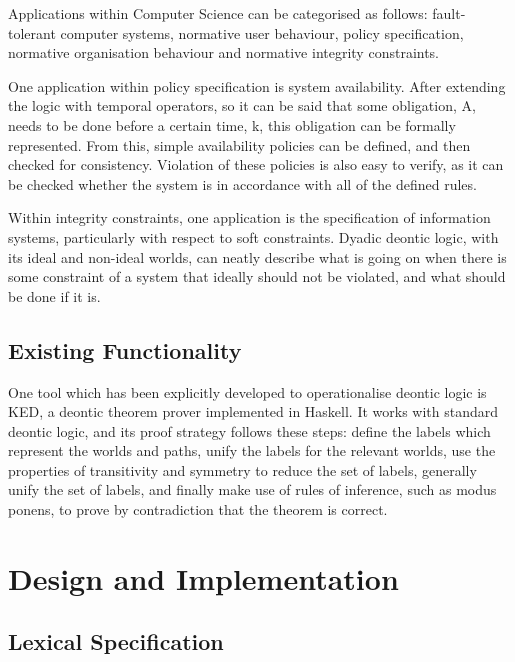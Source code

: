 \documentclass{l4proj}
\begin{document}
Applications within Computer Science can be categorised as follows\cite{meyer93applications}: fault-tolerant computer systems, normative user behaviour, policy specification, normative organisation behaviour and normative integrity constraints. %

One application within policy specification is system availability\cite{brunel04deontic}. After extending the logic with temporal operators, so it can be said that some obligation, A, needs to be done before a certain time, k, this obligation can be formally represented. From this, simple availability policies can be defined, and then checked for consistency. Violation of these policies is also easy to verify, as it can be checked whether the system is in accordance with all of the defined rules. 

Within integrity constraints, one application is the specification of information systems\cite{infosystems}, particularly with respect to soft constraints. Dyadic deontic logic, with its ideal and non-ideal worlds, can neatly describe what is going on when there is some constraint of a system that ideally should not be violated, and what should be done if it is. 

\section{Existing Functionality}
One tool which has been explicitly developed to operationalise deontic logic is KED\cite{KED}, a deontic theorem prover implemented in Haskell. It works with standard deontic logic, and its proof strategy follows these steps: define the labels which represent the worlds and paths, unify the labels for the relevant worlds, use the properties of transitivity and symmetry to reduce the set of labels, generally unify the set of labels, and finally make use of rules of inference, such as modus ponens, to prove by contradiction that the theorem is correct. 


\chapter{Design and Implementation}


\section{Lexical Specification}
\end{document}
